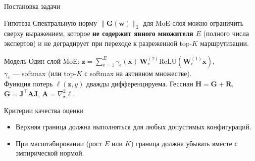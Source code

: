 \documentclass[aspectratio=169]{beamer}
\begin{document}
\begin{frame}{Постановка задачи}
    \begin{block}{Гипотеза}
        Спектральную норму $\|\mathbf{G}(\mathbf{w})\|_2$ для MoE‑слоя можно ограничить сверху
        выражением, которое \textbf{не содержит явного множителя $E$} (полного числа экспертов)
        и не деградирует при переходе к разреженной top‑$K$ маршрутизации.
    \end{block}

    \begin{block}{Модель}
        Один слой MoE: $\displaystyle \mathbf{z} = \sum_{e=1}^{E}\gamma_e(\mathbf{x})\,
        \mathbf{W}_e^{(2)}\mathrm{ReLU}(\mathbf{W}_e^{(1)}\mathbf{x})$,\\
        $\gamma_e$ --- softmax (или top‑$K$ с softmax на активном множестве).\\
        Функция потерь $\ell(\mathbf{z},y)$ дважды дифференцируема.
        Гессиан $\mathbf{H}=\mathbf{G}+\mathbf{R}$,
        $\mathbf{G}=\mathbf{J}^{\!\top}\mathbf{A}\mathbf{J}$,
        $\mathbf{A}=\nabla_{\mathbf{z}}^2\ell$.
    \end{block}

    \begin{block}{Критерии качества оценки}
        \begin{itemize}
            \item Верхняя граница должна выполняться для любых допустимых конфигураций.
            \item При масштабировании (рост $E$ или $K$) граница должна убывать вместе с эмпирической нормой.
        \end{itemize}
    \end{block}
\end{frame}
\end{document}
